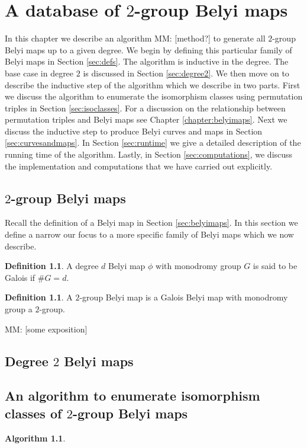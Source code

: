 \documentclass{dcthesis}
\newcommand{\defi}[1]{\textsf{#1}}
\newcommand{\mm}[1]{{\color{blue} \sf MM: [#1]}}
\theoremstyle{definition}
\newtheorem{definition}[prop]{Definition}
\newtheorem{alg}[prop]{Algorithm}
\theoremstyle{remark}
\begin{document}
\chapter{A database of $2$-group Belyi maps}{\label{chapter:database}
  In this chapter we describe an algorithm \mm{method?}
  to generate all $2$-group Belyi maps up to a given degree.
  We begin by defining this particular family of Belyi maps in Section \ref{sec:defs}.
  The algorithm is inductive in the degree.
  The base case in degree $2$ is discussed in Section \ref{sec:degree2}.
  We then move on to describe the inductive step of the algorithm
  which we describe in two parts.
  First we discuss the algorithm to enumerate the isomorphism classes
  using permutation triples in Section \ref{sec:isoclasses}.
  For a discussion on the relationship between permutation triples and Belyi maps
  see Chapter \ref{chapter:belyimaps}.
  Next we discuss the inductive step to produce Belyi curves and maps in Section \ref{sec:curvesandmaps}.
  In Section \ref{sec:runtime} we give a detailed description of the running time of the algorithm.
  Lastly,
  in Section \ref{sec:computations},
  we discuss the implementation and computations that we have carried out explicitly.
  \section{$2$-group Belyi maps}{\label{sec:defs}
    Recall the definition of a Belyi map in Section \ref{sec:belyimaps}.
    In this section we define a narrow our focus to a more specific family of Belyi maps
    which we now describe.
    \begin{definition}\label{def:galois}
      A degree $d$ Belyi map $\phi$ with monodromy group $G$
      is said to be \defi{Galois} if $\#G = d$.
    \end{definition}
    \begin{definition}\label{def:2groupbelyi}
      A \defi{$2$-group Belyi map} is a Galois Belyi map
      with monodromy group a $2$-group.
    \end{definition}
    \mm{some exposition}
  }
  \section{Degree $2$ Belyi maps}{\label{sec:degree2}
    \lipsum[1]
  }
  \section{An algorithm to enumerate isomorphism classes of $2$-group Belyi maps}{\label{sec:isoclasses}
    \begin{alg}\label{alg:triples}
    \end{alg}
  }
  \pagebreak
}
\end{document}
